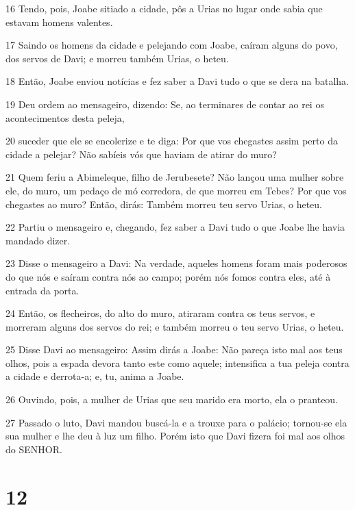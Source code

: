 \par 16 Tendo, pois, Joabe sitiado a cidade, pôs a Urias no lugar onde sabia que estavam homens valentes.
\par 17 Saindo os homens da cidade e pelejando com Joabe, caíram alguns do povo, dos servos de Davi; e morreu também Urias, o heteu.
\par 18 Então, Joabe enviou notícias e fez saber a Davi tudo o que se dera na batalha.
\par 19 Deu ordem ao mensageiro, dizendo: Se, ao terminares de contar ao rei os acontecimentos desta peleja,
\par 20 suceder que ele se encolerize e te diga: Por que vos chegastes assim perto da cidade a pelejar? Não sabíeis vós que haviam de atirar do muro?
\par 21 Quem feriu a Abimeleque, filho de Jerubesete? Não lançou uma mulher sobre ele, do muro, um pedaço de mó corredora, de que morreu em Tebes? Por que vos chegastes ao muro? Então, dirás: Também morreu teu servo Urias, o heteu.
\par 22 Partiu o mensageiro e, chegando, fez saber a Davi tudo o que Joabe lhe havia mandado dizer.
\par 23 Disse o mensageiro a Davi: Na verdade, aqueles homens foram mais poderosos do que nós e saíram contra nós ao campo; porém nós fomos contra eles, até à entrada da porta.
\par 24 Então, os flecheiros, do alto do muro, atiraram contra os teus servos, e morreram alguns dos servos do rei; e também morreu o teu servo Urias, o heteu.
\par 25 Disse Davi ao mensageiro: Assim dirás a Joabe: Não pareça isto mal aos teus olhos, pois a espada devora tanto este como aquele; intensifica a tua peleja contra a cidade e derrota-a; e, tu, anima a Joabe.
\par 26 Ouvindo, pois, a mulher de Urias que seu marido era morto, ela o pranteou.
\par 27 Passado o luto, Davi mandou buscá-la e a trouxe para o palácio; tornou-se ela sua mulher e lhe deu à luz um filho. Porém isto que Davi fizera foi mal aos olhos do SENHOR.

\chapter{12}

